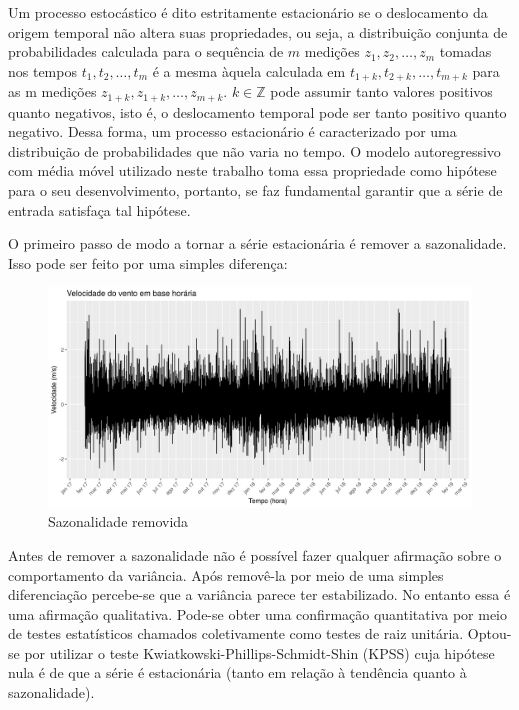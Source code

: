 \documentclass[
	12pt,				%
	openright,			%
	oneside,			%
	a4paper,			%
	english,			%
	french,				%
	spanish,			%
	brazil				%
	]{abntex2}
\begin{document}
Um processo estocástico é dito estritamente estacionário se o deslocamento da origem temporal não altera suas propriedades, ou seja, a distribuição conjunta de probabilidades calculada para o sequência de $m$ medições $z_1,z_2,\dots,z_m$ tomadas nos tempos $t_1, t_2, \dots, t_m$ é a mesma àquela calculada em $t_{1+k}, t_{2+k}, \dots, t_{m+k}$ para as m medições $z_{1+k},z_{1+k},\dots,z_{m+k}$. $k\in\mathbb{Z}$ pode assumir tanto valores positivos quanto negativos, isto é, o deslocamento temporal pode ser tanto positivo quanto negativo. Dessa forma, 
um processo estacionário é caracterizado por uma distribuição de probabilidades que não varia no tempo. O modelo autoregressivo com média móvel utilizado neste trabalho toma essa propriedade como hipótese para o seu desenvolvimento, portanto, se faz fundamental garantir que a série de entrada satisfaça tal hipótese.

O primeiro passo de modo a tornar a série estacionária é remover a sazonalidade. Isso pode ser feito por uma simples diferença:

\begin{figure}[h]
    \centering
	\includegraphics[width=\textwidth]{entire_series_hourly_basis_seasonless.png}
	\caption{Sazonalidade removida}
\end{figure}
\FloatBarrier

Antes de remover a sazonalidade não é possível fazer qualquer afirmação sobre o comportamento da variância. Após removê-la por meio de uma simples diferenciação percebe-se que a variância parece ter estabilizado. No entanto essa é uma afirmação qualitativa. Pode-se obter uma confirmação quantitativa por meio de testes estatísticos chamados coletivamente como testes de raiz unitária. Optou-se por utilizar o teste Kwiatkowski-Phillips-Schmidt-Shin (KPSS) cuja hipótese nula é de que a série é estacionária (tanto em relação à tendência quanto à sazonalidade).
\end{document}
